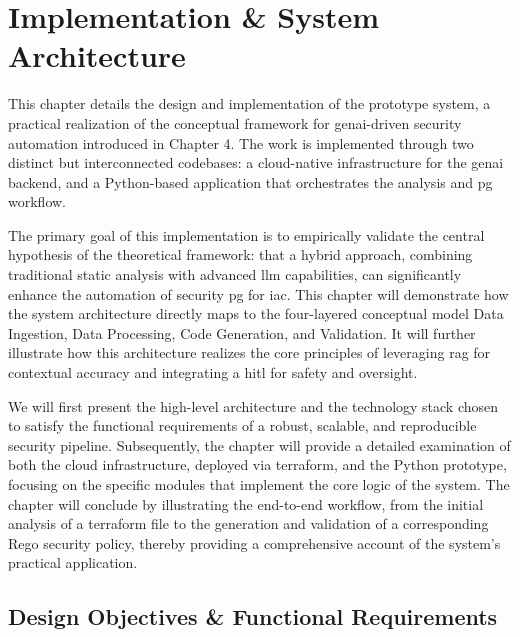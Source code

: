\chapter{Implementation \& System Architecture}


This chapter details the design and implementation of the prototype system, a practical realization of the conceptual framework for \gls{genai}-driven security automation introduced in Chapter 4. The work is implemented through two distinct but interconnected codebases: a cloud-native infrastructure for the \gls{genai} backend, and a Python-based application that orchestrates the analysis and \gls{pg} workflow.

The primary goal of this implementation is to empirically validate the central hypothesis of the theoretical framework: that a hybrid approach, combining traditional static analysis with advanced \gls{llm} capabilities, can significantly enhance the automation of security \gls{pg} for \gls{iac}. This chapter will demonstrate how the system architecture directly maps to the four-layered conceptual model Data Ingestion, Data Processing, Code Generation, and Validation. It will further illustrate how this architecture realizes the core principles of leveraging \gls{rag} for contextual accuracy and integrating a \gls{hitl} for safety and oversight.

We will first present the high-level architecture and the technology stack chosen to satisfy the functional requirements of a robust, scalable, and reproducible security pipeline. Subsequently, the chapter will provide a detailed examination of both the cloud infrastructure, deployed via \gls{terraform}, and the Python prototype, focusing on the specific modules that implement the core logic of the system. The chapter will conclude by illustrating the end-to-end workflow, from the initial analysis of a \gls{terraform} file to the generation and validation of a corresponding Rego security policy, thereby providing a comprehensive account of the system's practical application.

\section{Design Objectives \& Functional Requirements}



